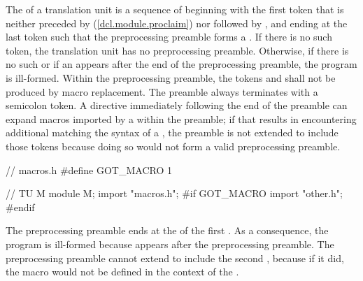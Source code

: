 \begin{after}
\begin{std.txt}
\color{addclr}
\alinea
The  of a translation unit is
a sequence of 
beginning with the first  token that is
neither preceded by  (\ref{dcl.module.proclaim})
nor followed by \tcode{;},
and ending at the last \tcode{;} token such that
the preprocessing preamble forms a .
If there is no such  token,
the translation unit has no preprocessing preamble.
Otherwise, if there is no such 
or if an  
appears after the end of the preprocessing preamble,
the program is ill-formed.
Within the preprocessing preamble, the tokens
 and 
shall not be produced by macro replacement.
\enternote
The preamble always terminates with a semicolon token.
A  directive immediately following the end of the preamble
can expand macros imported by a  within the
preamble; if that results in encountering additional
 matching the syntax of a
, the preamble is not extended to include
those tokens because doing so would not form a valid preprocessing preamble.
\begin{example}
\begin{codeblock}
// macros.h
#define GOT_MACRO 1

// TU M
module M;
import "macros.h";
#if GOT_MACRO
import "other.h";
#endif
\end{codeblock}
The preprocessing preamble ends at the \tcode{;} of the first .
As a consequence, the program is ill-formed because 
appears after the preprocessing preamble.
The preprocessing preamble cannot extend to include the second ,
because if it did, the macro  would not be defined in the
context of the .
\end{example}
\exitnote
\end{std.txt}

\end{after}
